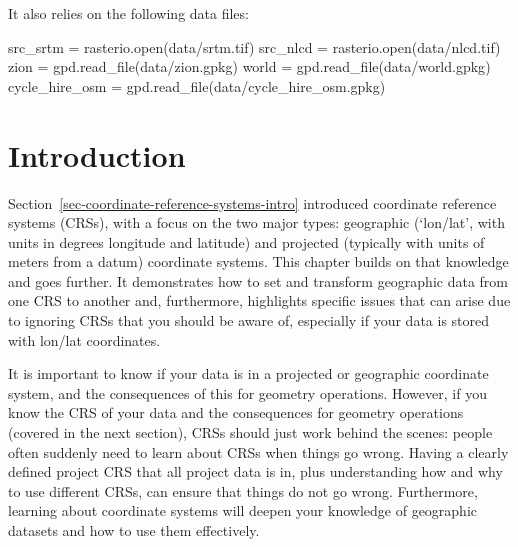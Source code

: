 \documentclass[
  letterpaper,
]{krantz}
\newenvironment{Shaded}{\begin{snugshade}}{\end{snugshade}}
\newcommand{\BuiltInTok}[1]{\textcolor[rgb]{0.00,0.23,0.31}{#1}}
\newcommand{\NormalTok}[1]{\textcolor[rgb]{0.00,0.23,0.31}{#1}}
\newcommand{\OperatorTok}[1]{\textcolor[rgb]{0.37,0.37,0.37}{#1}}
\newcommand{\StringTok}[1]{\textcolor[rgb]{0.13,0.47,0.30}{#1}}
\begin{document}
It also relies on the following data files:

\begin{Shaded}
\begin{Highlighting}[]
\NormalTok{src\_srtm }\OperatorTok{=}\NormalTok{ rasterio.}\BuiltInTok{open}\NormalTok{(}\StringTok{\textquotesingle{}data/srtm.tif\textquotesingle{}}\NormalTok{)}
\NormalTok{src\_nlcd }\OperatorTok{=}\NormalTok{ rasterio.}\BuiltInTok{open}\NormalTok{(}\StringTok{\textquotesingle{}data/nlcd.tif\textquotesingle{}}\NormalTok{)}
\NormalTok{zion }\OperatorTok{=}\NormalTok{ gpd.read\_file(}\StringTok{\textquotesingle{}data/zion.gpkg\textquotesingle{}}\NormalTok{)}
\NormalTok{world }\OperatorTok{=}\NormalTok{ gpd.read\_file(}\StringTok{\textquotesingle{}data/world.gpkg\textquotesingle{}}\NormalTok{)}
\NormalTok{cycle\_hire\_osm }\OperatorTok{=}\NormalTok{ gpd.read\_file(}\StringTok{\textquotesingle{}data/cycle\_hire\_osm.gpkg\textquotesingle{}}\NormalTok{)}
\end{Highlighting}
\end{Shaded}

\section{Introduction}\label{introduction-5}

Section~\ref{sec-coordinate-reference-systems-intro} introduced
coordinate reference systems (CRSs), with a focus on the two major
types: geographic (`lon/lat', with units in degrees longitude and
latitude) and projected (typically with units of meters from a datum)
coordinate systems. This chapter builds on that knowledge and goes
further. It demonstrates how to set and transform geographic data from
one CRS to another and, furthermore, highlights specific issues that can
arise due to ignoring CRSs that you should be aware of, especially if
your data is stored with lon/lat coordinates.

It is important to know if your data is in a projected or geographic
coordinate system, and the consequences of this for geometry operations.
However, if you know the CRS of your data and the consequences for
geometry operations (covered in the next section), CRSs should just work
behind the scenes: people often suddenly need to learn about CRSs when
things go wrong. Having a clearly defined project CRS that all project
data is in, plus understanding how and why to use different CRSs, can
ensure that things do not go wrong. Furthermore, learning about
coordinate systems will deepen your knowledge of geographic datasets and
how to use them effectively.
\end{document}
